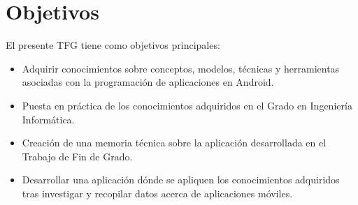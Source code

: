 %
%
%
%

\chapter{Objetivos} \label{chap:objetives}  

El presente TFG tiene como objetivos principales:

\begin{itemize}
\item Adquirir conocimientos sobre conceptos, modelos, técnicas y herramientas asociadas con la programación de aplicaciones en Android.
\item Puesta en práctica de los conocimientos adquiridos en el Grado en Ingeniería Informática.
\item Creación de una memoria técnica sobre la aplicación desarrollada en el Trabajo de Fin de Grado.
\item Desarrollar una aplicación dónde se apliquen los conocimientos adquiridos tras investigar y recopilar datos acerca de aplicaciones móviles.
\end{itemize}
